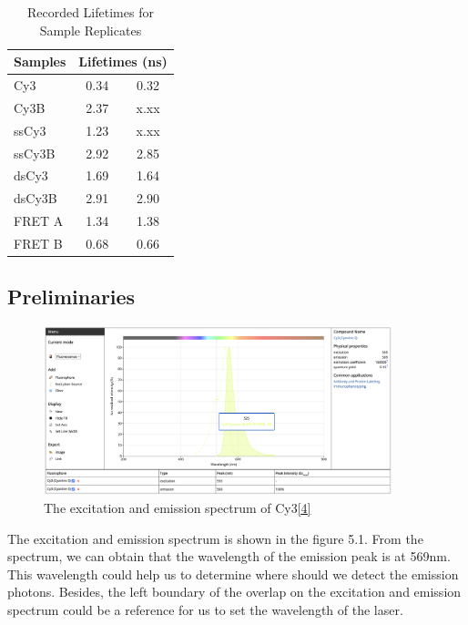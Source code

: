\documentclass[a4paper,english,12pt,bibliography=totoc]{scrreprt}
\begin{document}
\begin{table}[h]
\centering
\begin{tabular}{|l|c|c|}
\hline
\textbf{Samples} & \multicolumn{2}{c|}{\textbf{Lifetimes (ns)}} \\
\hline
Cy3 & 0.34 & 0.32 \\
\hline
Cy3B & 2.37 & x.xx \\
\hline
ssCy3 & 1.23 & x.xx \\
\hline
ssCy3B & 2.92 & 2.85 \\
\hline
dsCy3 & 1.69 & 1.64 \\
\hline
dsCy3B & 2.91 & 2.90 \\
\hline
FRET A & 1.34 & 1.38 \\
\hline
FRET B & 0.68 & 0.66 \\
\hline
\end{tabular}
\caption{Recorded Lifetimes for Sample Replicates}
\label{tab:lifetimes}
\end{table}



\subsection{Preliminaries}
\begin{figure}[H]
        \centering
        \includegraphics[width=0.9\textwidth]{images/other/Cy3_properties.png}
	    \caption{The excitation and emission spectrum of Cy3\hyperref[sec:ref_4]{[4]}}
\end{figure}
The excitation and emission spectrum is shown in the figure 5.1. From the spectrum, we can obtain that the wavelength of the emission peak is at 569nm. This wavelength could help us to determine where should we detect the emission photons. Besides, the left boundary of the overlap on the excitation and emission spectrum could be a reference for us to set the wavelength of the laser.\\
\end{document}
